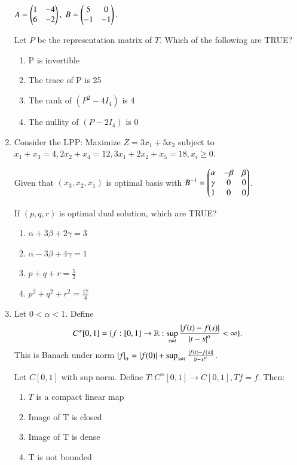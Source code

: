 \documentclass[journal,12pt,onecolumn]{IEEEtran}
\theoremstyle{remark}
\begin{document}
\begin{enumerate}
$A=\begin{pmatrix}1 & -4 \\ 6 & -2\end{pmatrix}, \; B=\begin{pmatrix}5 & 0 \\ -1 & -1\end{pmatrix}.$  

Let $P$ be the representation matrix of $T$. Which of the following are TRUE?  

\begin{enumerate}
\item P is invertible
\item The trace of P is 25
\item The rank of $(P^2-4I_4)$ is 4
\item The nullity of $(P-2I_4)$ is 0
\end{enumerate}
\hfill{}

\item Consider the LPP: Maximize $Z=3x_1+5x_2$ subject to $x_1+x_3=4, 2x_2+x_4=12, 3x_1+2x_2+x_5=18, x_i\geq 0$.  

Given that $(x_3,x_2,x_1)$ is optimal basis with $B^{-1}=\begin{pmatrix}\alpha & -\beta & \beta \\ \gamma & 0 & 0 \\ 1 & 0 & 0\end{pmatrix}$.  

If $(p,q,r)$ is optimal dual solution, which are TRUE?  

\begin{enumerate}
\item $\alpha+3\beta+2\gamma=3$
\item $\alpha-3\beta+4\gamma=1$
\item $p+q+r=\tfrac{5}{2}$
\item $p^2+q^2+r^2=\tfrac{17}{4}$
\end{enumerate}
\hfill{}

\item Let $0<\alpha<1$. Define  
$$
C^\alpha[0,1]=\{f:[0,1]\to\mathbb{R}: \sup_{s\neq t}\frac{\left\vert f(t)-f(s)\right\vert}{\left\vert t-s\right\vert^\alpha}<\infty\}.
$$  
This is Banach under norm $\left\vert f\right\vert_\alpha=\left\vert f(0)\right\vert+\sup_{s\neq t}\frac{\left\vert f(t)-f(s)\right\vert}{\left\vert t-s\right\vert^\alpha}$.  

Let $C[0,1]$ with sup norm. Define $T:C^\alpha[0,1]\to C[0,1], Tf=f$. Then:  

\begin{enumerate}
\item $T$ is a compact linear map
\item Image of T is closed
\item Image of T is dense
\item T is not bounded
\end{enumerate}
\hfill{}


\end{enumerate}
\end{document}
